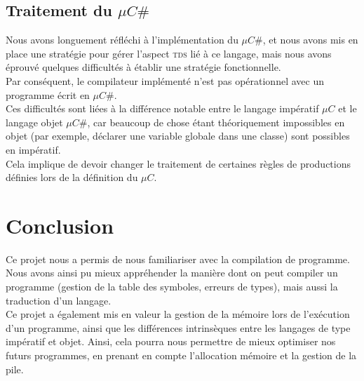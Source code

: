 \documentclass[11pt,a4paper]{report}
\begin{document}
\subsection{Traitement du $\mu C \#$}

Nous avons longuement réfléchi à l'implémentation du $\mu C \#$, et nous avons mis en place une stratégie pour gérer l'aspect \textsc{tds} lié à ce langage, mais nous avons éprouvé quelques difficultés à établir une stratégie fonctionnelle.\\
Par conséquent, le compilateur implémenté n'est pas opérationnel avec un programme écrit en $\mu C \#$.\\
Ces difficultés sont liées à la différence notable entre le langage impératif $\mu C$ et le langage objet $\mu C \#$, car beaucoup de chose étant théoriquement impossibles en objet (par exemple, déclarer une variable globale dans une classe) sont possibles en impératif.\\
 Cela implique de devoir changer le traitement de certaines règles de productions définies lors de la définition du $\mu C$.

\section*{Conclusion}


Ce projet nous a permis de nous familiariser avec la compilation de programme. Nous avons ainsi pu mieux appréhender la manière dont on peut compiler un programme (gestion de la table des symboles, erreurs de types), mais aussi la traduction d'un langage. \\
Ce projet a également mis en valeur la gestion de la mémoire lors de l'exécution d'un programme, ainsi que les différences intrinsèques entre les langages de type impératif et objet.
Ainsi, cela pourra nous permettre de mieux optimiser nos futurs programmes, en prenant en compte l'allocation mémoire et la gestion de la pile.
\end{document}
